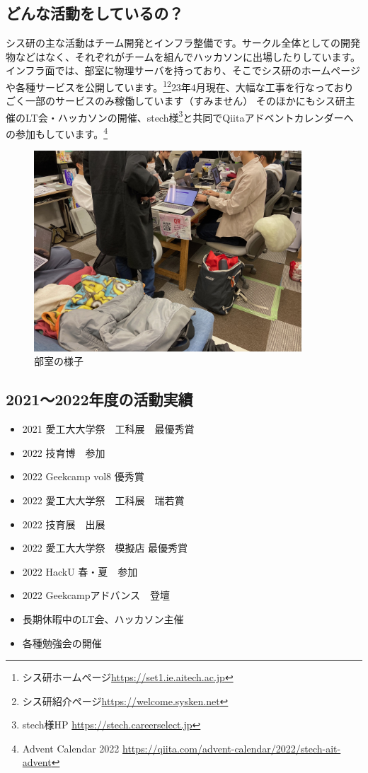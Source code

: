 \subsection{どんな活動をしているの？}
シス研の主な活動はチーム開発とインフラ整備です。サークル全体としての開発物などはなく、それぞれがチームを組んでハッカソンに出場したりしています。 \\
インフラ面では、部室に物理サーバを持っており、そこでシス研のホームページや各種サービスを公開しています。\footnote{シス研ホームページ\url{https://set1.ie.aitech.ac.jp}}\footnote{シス研紹介ページ\url{https://welcome.sysken.net}}23年4月現在、大幅な工事を行なっておりごく一部のサービスのみ稼働しています（すみません）
そのほかにもシス研主催のLT会・ハッカソンの開催、stech様\footnote{stech様HP \url{https://stech.careerselect.jp}}と共同でQiitaアドベントカレンダーへの参加もしています。\footnote{Advent Calendar 2022 \url{https://qiita.com/advent-calendar/2022/stech-ait-advent}}
\begin{figure}[bht]
  \centering
  \includegraphics[width=10cm]{./image/02-AboutSysken/room.jpg}
  \caption{部室の様子}
\end{figure}

\subsection{2021〜2022年度の活動実績}
\begin{itemize}
  \item 2021 愛工大大学祭　工科展　最優秀賞
  \item 2022 技育博　参加
  \item 2022 Geekcamp vol8 優秀賞
  \item 2022 愛工大大学祭　工科展　瑞若賞
  \item 2022 技育展　出展
  \item 2022 愛工大大学祭　模擬店 最優秀賞
  \item 2022 HackU 春・夏　参加
  \item 2022 Geekcampアドバンス　登壇
  \item 長期休暇中のLT会、ハッカソン主催
  \item 各種勉強会の開催
\end{itemize}

